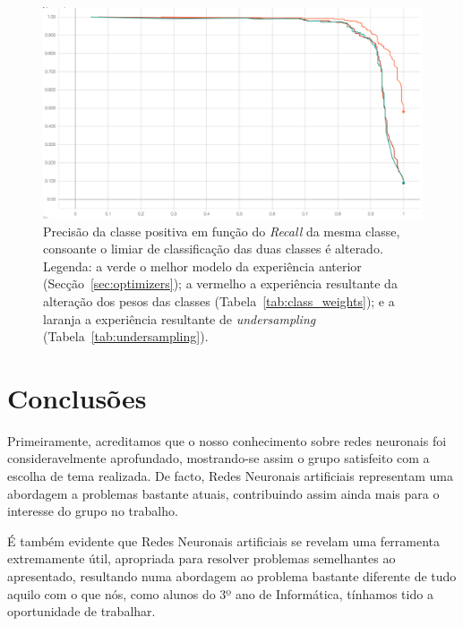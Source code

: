 \documentclass[]{article}
\begin{document}
\begin{figure}[h!]
\centering
\includegraphics[scale=0.30]{img/precision-recall_curve_normal_undersampled_class_weights.png}
\caption{Precisão da classe positiva em função do \textit{Recall} da mesma classe, consoante o limiar de classificação das duas classes é alterado. Legenda: a verde o melhor modelo da experiência anterior (Secção~\ref{sec:optimizers}); a vermelho a experiência resultante da alteração dos pesos das classes (Tabela~\ref{tab:class_weights}); e a laranja a experiência resultante de \textit{undersampling} (Tabela~\ref{tab:undersampling}).}
\label{fig:precision-recall_curve_normal_undersampled_class_weights}
\end{figure}



\section{Conclusões}
\label{sec:conclusao}
 	Primeiramente, acreditamos que o nosso conhecimento sobre redes neuronais foi consideravelmente aprofundado, mostrando-se assim o grupo satisfeito com a escolha de tema realizada. De facto, Redes Neuronais artificiais representam uma abordagem a problemas bastante atuais, contribuindo assim ainda mais para o interesse do grupo no trabalho.
    
	É também evidente que Redes Neuronais artificiais se revelam uma ferramenta extremamente útil, apropriada para resolver problemas semelhantes ao apresentado, resultando numa abordagem ao problema bastante diferente de tudo aquilo com o que nós, como alunos do 3º ano de Informática, tínhamos tido a oportunidade de trabalhar.
    
\end{document}
